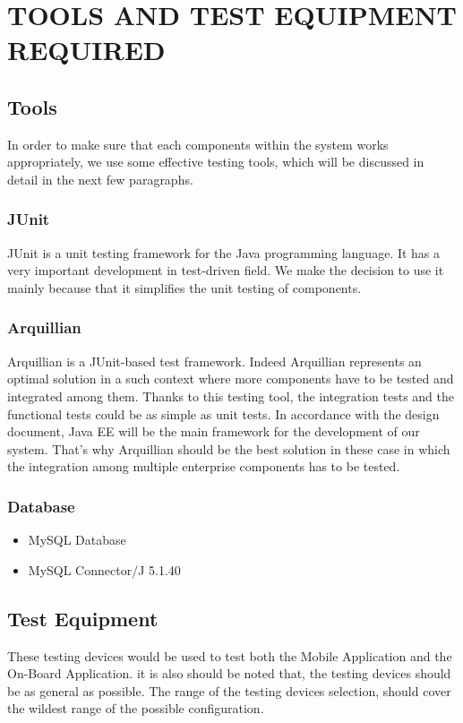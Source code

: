 \documentclass[a4paper,11pt]{article}
\begin{document}
\newpage
\section{TOOLS AND TEST EQUIPMENT REQUIRED}
	\subsection{Tools}
	In order to make sure that each components within the system works appropriately, we use some effective testing tools, which will be discussed in detail in the next few paragraphs.
		\subsubsection{JUnit}
		JUnit is a unit testing framework for the Java programming language. It has a very important development in test-driven field. We make the decision to use it mainly because that it simplifies the unit testing of components. 
		\subsubsection{Arquillian}
		Arquillian is a JUnit-based test framework. Indeed Arquillian represents an optimal solution in a such context where more components have to be tested and integrated among them. Thanks to this testing tool, the integration tests and the functional tests could be as simple as unit tests. In accordance with the design document, Java EE will be the main framework for the development of our system. That's why Arquillian should be the best solution in these case in which the integration among multiple enterprise components has to be tested.
		\subsubsection{Database}
		\begin{itemize}
		\item MySQL Database
		\item MySQL Connector/J 5.1.40
		\end{itemize}				
		
	\subsection{Test Equipment}
	These testing devices would be used to test both the Mobile Application and the On-Board Application. it is also should be noted that, the testing devices should be as general as possible. The range of the testing devices selection, should cover the wildest range of the possible configuration.
\end{document}
